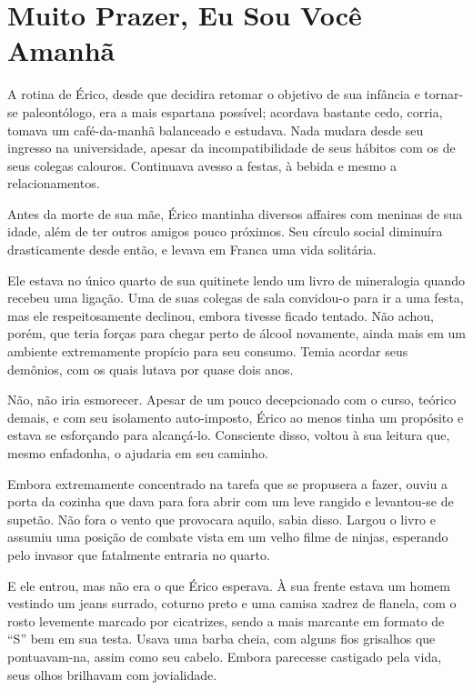 \chapter{Muito Prazer, Eu Sou Você Amanhã}


A rotina de Érico, desde que decidira retomar o objetivo de sua infância
e tornar-se paleontólogo, era a mais espartana possível; acordava
bastante cedo, corria, tomava um café-da-manhã balanceado e estudava.
Nada mudara desde seu ingresso na universidade, apesar da
incompatibilidade de seus hábitos com os de seus colegas calouros.
Continuava avesso a festas, à bebida e mesmo a relacionamentos.

Antes da morte de sua mãe, Érico mantinha diversos affaires com meninas
de sua idade, além de ter outros amigos pouco próximos. Seu círculo
social diminuíra drasticamente desde então, e levava em Franca uma vida
solitária.

Ele estava no único quarto de sua quitinete lendo um livro de
mineralogia quando recebeu uma ligação. Uma de suas colegas de sala
convidou-o para ir a uma festa, mas ele respeitosamente declinou, embora
tivesse ficado tentado. Não achou, porém, que teria forças para chegar
perto de álcool novamente, ainda mais em um ambiente extremamente
propício para seu consumo. Temia acordar seus demônios, com os quais
lutava por quase dois anos.

Não, não iria esmorecer. Apesar de um pouco decepcionado com o curso,
teórico demais, e com seu isolamento auto-imposto, Érico ao menos tinha
um propósito e estava se esforçando para alcançá-lo. Consciente disso,
voltou à sua leitura que, mesmo enfadonha, o ajudaria em seu caminho.

Embora extremamente concentrado na tarefa que se propusera a fazer,
ouviu a porta da cozinha que dava para fora abrir com um leve rangido e
levantou-se de supetão. Não fora o vento que provocara aquilo, sabia
disso. Largou o livro e assumiu uma posição de combate vista em um velho
filme de ninjas, esperando pelo invasor que fatalmente entraria no
quarto.

E ele entrou, mas não era o que Érico esperava. À sua frente estava um
homem vestindo um jeans surrado, coturno preto e uma camisa xadrez de
flanela, com o rosto levemente marcado por cicatrizes, sendo a mais
marcante em formato de “S” bem em sua testa. Usava uma barba cheia, com
alguns fios grisalhos que pontuavam-na, assim como seu cabelo. Embora
parecesse castigado pela vida, seus olhos brilhavam com jovialidade.

